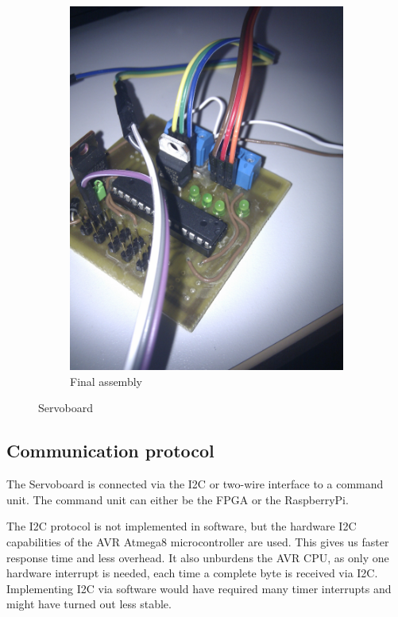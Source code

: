 \documentclass[a4paper
               ,10pt
               ,DIV=10 %
               ,BCOR=0.3cm
               ,pagesize %
               ,headings=small
               ,bibtotoc
               ]
               {scrartcl}
\begin{document}
\begin{figure}[H]
\begin{subfigure}[b]{0.3\textwidth}
		\label{figservoboard3d}
  \end{subfigure}~
  \begin{subfigure}[b]{0.3\textwidth}
    \centering
    \includegraphics[width=\textwidth]{pic/servoboardr.jpg}
    \caption{Final assembly}
		\label{figservoboardr}
  \end{subfigure}
  \caption{Servoboard}
\end{figure}
\subsection{Communication protocol}
The Servoboard is connected via the I2C or two-wire interface to a command unit.
The command unit can either be the FPGA or the RaspberryPi.


The I2C protocol is not implemented in software, but the hardware I2C capabilities of the AVR Atmega8 microcontroller are used.
This gives us faster response time and less overhead.
It also unburdens the AVR CPU, as only one hardware interrupt is needed, each time a complete byte is received via I2C.
Implementing I2C via software would have required many timer interrupts and might have turned out less stable.
\end{document}
